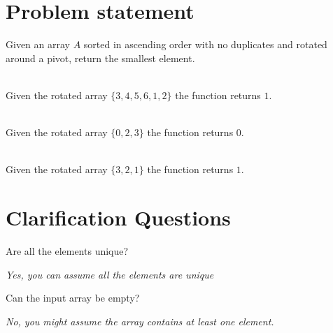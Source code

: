 \section{Problem statement}
\begin{exercise}
Given an array $A$ sorted in ascending order with no duplicates and rotated around a pivot, return the smallest element.

	\begin{example}
		\hfill \\
		Given the rotated array $\{3,4,5,6,1,2\}$ the function returns $1$.
	\end{example}

	\begin{example}
		\hfill \\
		Given the rotated array $\{0,2,3\}$ the function returns $0$.
	\end{example}

	\begin{example}
		\hfill \\
		Given the rotated array $\{3,2,1\}$ the function returns $1$.
	\end{example}
\end{exercise}

\section{Clarification Questions}

\begin{QandA}
	\item \begin{questionitem} \begin{question} Are all the elements unique?   \end{question} 	 
    \begin{answered}
		\textit{Yes, you can assume all the elements are unique}
	\end{answered} \end{questionitem}
	\item \begin{questionitem} \begin{question} Can the input array be empty?  \end{question} 	 
    \begin{answered}
		\textit{No, you might assume the array contains at least one element.}
	\end{answered} \end{questionitem}
\end{QandA}

